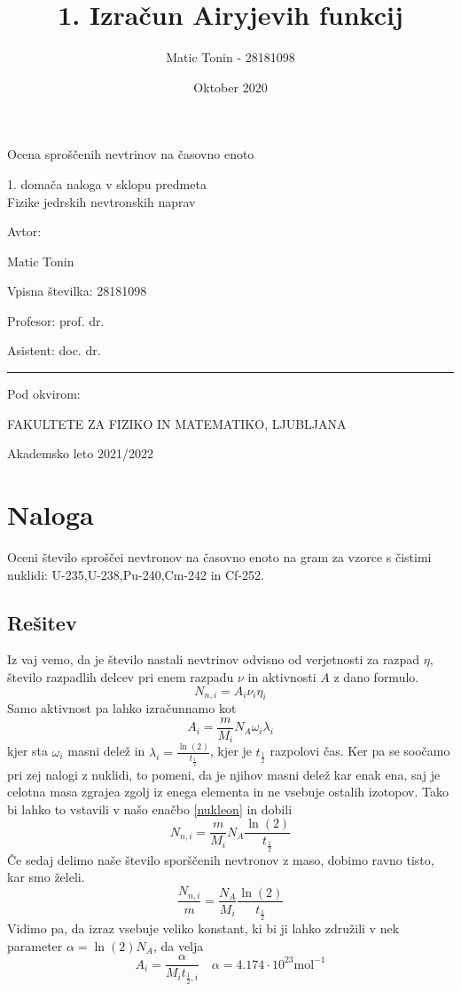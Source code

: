 \documentclass[slovene,11pt,a4paper]{article}
\title{1. Izračun Airyjevih funkcij}
\author{Matic Tonin - 28181098 }
\date{Oktober 2020}
\begin{document}
\begin{center}
\thispagestyle{empty}
\parskip=14pt%
\vspace*{3\parskip}%
\begin{Huge}Ocena sproščenih nevtrinov na časovno enoto\end{Huge}


1. domača naloga v sklopu predmeta \\
Fizike jedrskih nevtronskih naprav

Avtor:

Matic Tonin

Vpisna številka: 28181098

Profesor: prof. dr. 

Asistent: doc. dr. 


\rule{7cm}{0.4pt}

Pod okvirom:

FAKULTETE ZA FIZIKO IN MATEMATIKO, LJUBLJANA

Akademsko leto 2021/2022


\end{center}
\pagebreak
\section*{Naloga}
Oceni število sproščei nevtronov na časovno enoto na gram za vzorce s čistimi nuklidi: U-235,U-238,Pu-240,Cm-242 in Cf-252.
\subsection*{Rešitev}
Iz vaj vemo, da je število nastali nevtrinov odvisno od verjetnosti za razpad $\eta$, število razpadlih delcev pri enem razpadu $\nu$ in aktivnosti $A$ z dano formulo.
\begin{equation}
    N_{n,i}=A_i\nu_i \eta_i
    \label{nukleon}
\end{equation}
Samo aktivnost pa lahko izračunnamo kot 
\begin{equation*}
    A_i=\frac{m}{M_i}N_A\omega_i \lambda_i
\end{equation*}
kjer sta $\omega_i$ masni delež in $\lambda_i=\frac{\ln(2)}{t_{\frac{1}{2}}}$, kjer je $t_{\frac{1}{2}}$ razpolovi čas. Ker pa se soočamo pri zej nalogi z nuklidi, to pomeni, da je njihov masni delež kar enak ena, saj je celotna masa zgrajea zgolj iz enega elementa in ne vsebuje ostalih izotopov.
Tako bi lahko to vstavili v našo enačbo \eqref{nukleon} in dobili
\begin{equation}
    N_{n,i}=\frac{m}{M_i}N_A \frac{\ln(2)}{t_{\frac{1}{2}}}
\end{equation}
Če sedaj delimo naše število sporščenih nevtronov z maso, dobimo ravno tisto, kar smo želeli.
\begin{equation}
        \frac{N_{n,i}}{m}=\frac{N_A}{M_i} \frac{\ln(2)}{t_{\frac{1}{2}}}
\end{equation}
Vidimo pa, da izraz vsebuje veliko konstant, ki bi ji lahko združili v nek parameter $\alpha=\ln(2)N_A$, da velja
\begin{equation}
    A_i=\frac{\alpha}{M_i t_{\frac{1}{2},i}} \quad \alpha=4.174 \cdot 10^{23} \text{mol}^{-1}
\end{equation}
\end{document}
